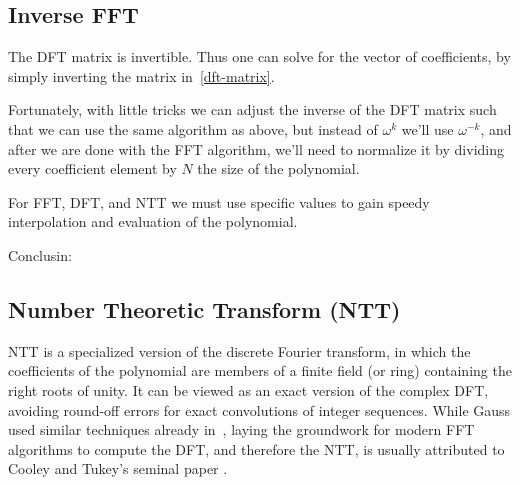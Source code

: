 
\subsection{Inverse FFT}\label{ifft}

The DFT matrix is invertible.
Thus one can solve for the vector of coefficients,
by simply inverting the matrix in~\ref{dft-matrix}.

Fortunately, with little tricks we can adjust the inverse of the DFT matrix such that
we can use the same algorithm as above, but instead of
$\omega^k$ we'll use $\omega^{-k}$, and after we are done with the FFT
algorithm, we'll need to normalize it by dividing every coefficient element
by $N$ the size of the polynomial.

 \begin{corollary}
  For FFT, DFT, and NTT we must use specific values to gain speedy interpolation and
  evaluation of the polynomial. 
 \end{corollary}{Conclusin:}
 
\subsection{Number Theoretic Transform (NTT)}\label{ntt}

NTT is a specialized version of the discrete Fourier transform,
in which the coefficients of the polynomial are members of a finite field (or ring)
 containing the right roots of unity.
It can be viewed as an exact version of the complex DFT, avoiding 
round-off errors for exact convolutions of integer sequences.
While Gauss used similar techniques already in~\cite{gaussfft}, laying the groundwork 
for modern FFT algorithms to compute the DFT, and therefore the NTT, 
is usually attributed to Cooley and Tukey's seminal paper \cite{fft}.

